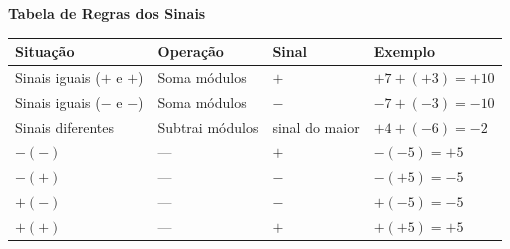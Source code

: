 \documentclass[12pt,twoside]{article}
\begin{document}
\vspace{0.5cm}

\begin{center}
\textbf{\Large Tabela de Regras dos Sinais}
\end{center}

\setlength{\tabcolsep}{12pt}
\begin{tabular}{llll}
\hline
\textbf{Situação} & \textbf{Operação} & \textbf{Sinal} & \textbf{Exemplo} \\
\hline
Sinais iguais ($+$ e $+$) & Soma módulos & $+$ & $+7+(+3)=+10$ \\
Sinais iguais ($-$ e $-$) & Soma módulos & $-$ & $-7+(-3)=-10$ \\
Sinais diferentes         & Subtrai módulos & sinal do maior & $+4+(-6)=-2$ \\
$-(-)$                    & —               & $+$            & $-(-5)=+5$ \\
$-(+)$                    & —               & $-$            & $-(+5)=-5$ \\
$+(-)$                    & —               & $-$            & $+(-5)=-5$ \\
$+(+)$                    & —               & $+$            & $+(+5)=+5$ \\
\hline
\end{tabular}


\end{document}
